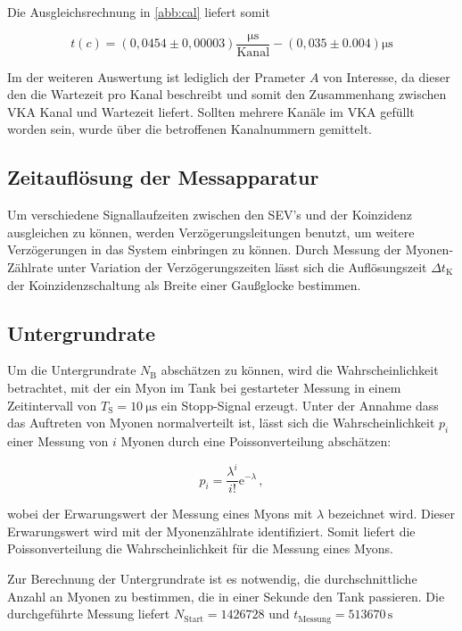 \noindent Die Ausgleichsrechnung in \ref{abb:cal} liefert somit

\begin{equation}
	t(c) = (0,0454 \pm 0,00003)\frac{\si{\micro\second}}{\text{Kanal}} - (0,035 \pm 0.004) \si{\micro\second}
\end{equation}

\noindent Im der weiteren Auswertung ist lediglich der Prameter $A$ von Interesse, da dieser den die Wartezeit pro Kanal beschreibt und somit den Zusammenhang zwischen VKA Kanal und Wartezeit liefert. Sollten mehrere 
Kanäle im VKA gefüllt worden sein, wurde über die betroffenen Kanalnummern gemittelt.

\subsection{Zeitauflösung der Messapparatur}
\label{subsec:timeresolution}
Um verschiedene Signallaufzeiten zwischen den SEV's und der Koinzidenz ausgleichen zu können, werden Verzögerungsleitungen benutzt, um weitere Verzögerungen in das System einbringen zu können. Durch Messung der Myonen-Zählrate unter Variation der Verzögerungszeiten lässt sich die Auflösungszeit $\Delta t_\text{K}$ der Koinzidenzschaltung als Breite einer Gaußglocke bestimmen.


\subsection{Untergrundrate}
\label{subsec:underground}

Um die Untergrundrate $N_\text{B}$ abschätzen zu können, wird die Wahrscheinlichkeit betrachtet, mit der ein Myon im Tank bei gestarteter Messung in einem Zeitintervall von $T_\text{S} = \SI{10}{\micro \second}$ ein Stopp-Signal erzeugt. Unter der Annahme dass das Auftreten von Myonen normalverteilt ist, lässt sich die Wahrscheinlichkeit $p_i$ einer Messung von $i$ Myonen durch eine Poissonverteilung abschätzen:

\begin{equation}
p_i = \frac{\lambda^i}{i!}\mathrm{e}^{-\lambda}\,,
\end{equation}

\noindent wobei der Erwarungswert der Messung eines Myons mit $\lambda$ bezeichnet wird. Dieser Erwarungswert wird mit der Myonenzählrate identifiziert. Somit liefert die Poissonverteilung die Wahrscheinlichkeit
für die Messung eines Myons.

\noindent Zur Berechnung der Untergrundrate ist es notwendig, die durchschnittliche Anzahl an Myonen zu bestimmen, die in einer Sekunde den Tank passieren.
Die durchgeführte Messung liefert $N_{\text{Start}} = 1426728$ und $t_{\text{Messung}} = 513670 \, \si{\second}$


